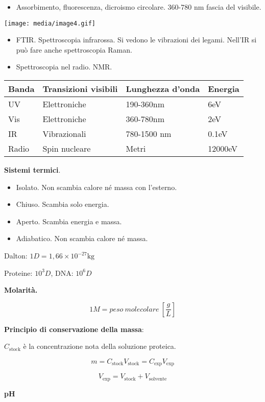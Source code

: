 \begin{itemize}
\item
  Assorbimento, fluorescenza, dicroismo circolare. 360-780 nm fascia del
  visibile.
\end{itemize}

\texttt{[image: media/image4.gif]}

\begin{itemize}
\item
  FTIR. Spettroscopia infrarossa. Si vedono le vibrazioni dei legami.
  Nell'IR si può fare anche spettroscopia Raman.
\item
  Spettroscopia nel radio. NMR.
\end{itemize}

\begin{longtable}[c]{@{}llll@{}}
\toprule
Banda & Transizioni visibili & Lunghezza d'onda & Energia\tabularnewline
\midrule
\endhead
UV & Elettroniche & 190-360nm & 6eV\tabularnewline
Vis & Elettroniche & 360-780nm & 2eV\tabularnewline
IR & Vibrazionali & 780-1500 nm & 0.1eV\tabularnewline
Radio & Spin nucleare & Metri & 12000eV\tabularnewline
\bottomrule
\end{longtable}

\textbf{Sistemi termici}.

\begin{itemize}
\item
  Isolato. Non scambia calore né massa con l'esterno.
\item
  Chiuso. Scambia solo energia.
\item
  Aperto. Scambia energia e massa.
\item
  Adiabatico. Non scambia calore né massa.
\end{itemize}

Dalton: \(1D = 1,66 \times 10^{- 27}\text{kg}\)

Proteine: \(10^{3}D\), DNA: \(10^{6}D\)

\textbf{Molarità. }

\[1M = peso\ molecolare\ \left\lbrack \frac{g}{L} \right\rbrack\]

\textbf{Principio di conservazione della massa}:

\(C_{\text{stock}}\) è la concentrazione nota della soluzione proteica.

\[m = C_{\text{stock}}V_{\text{stock}} = C_{\exp}V_{\exp}\]

\[V_{\exp} = V_{\text{stock}} + V_{\text{solvente}}\]

\textbf{pH}


